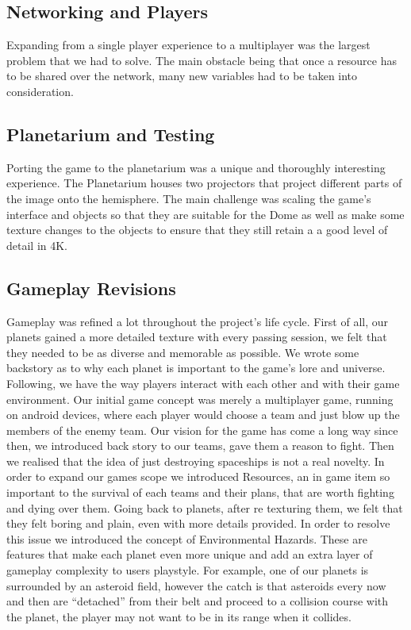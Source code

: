 \documentclass[11pt,a4paper]{article}
\begin{document}
        \subsection{Networking and Players}
        Expanding from a single player experience to a multiplayer was the largest problem that we had to solve. The main obstacle being that once a resource has to be shared over the network, many new variables had to be taken into consideration.

        \subsection{Planetarium and Testing}
        Porting the game to the planetarium was a unique and thoroughly interesting experience. The Planetarium houses two projectors that project different parts of the image onto the hemisphere. The main challenge was scaling the game's interface and objects so that they are suitable for the Dome as well as make some texture changes to the objects to ensure that they still retain a a good level of detail in 4K.

        \subsection{Gameplay Revisions}
        Gameplay was refined a lot throughout the project's life cycle. 
        First of all, our planets gained a more detailed texture with every passing session, we felt that they needed to be as diverse and memorable as possible. We wrote some backstory as to why each planet is important to the game's lore and universe. 
        Following, we have the way players interact with each other and with their game environment. Our initial game concept was merely a multiplayer game, running on android devices, where each player would choose a team and just blow up the members of the enemy team. Our vision for the game has come a long way since then, we introduced back story to our teams, gave them a reason to fight. Then we realised that the idea of just destroying spaceships is not a real novelty. In order to expand our games scope we introduced Resources, an in game item so important to the survival of each teams and their plans, that are worth fighting and dying over them. 
        Going back to planets, after re texturing them, we felt that they felt boring and plain, even with more details provided. In order to resolve this issue we introduced the concept of Environmental Hazards. These are features that make each planet even more unique and add an extra layer of gameplay complexity to users playstyle. For example, one of our planets is surrounded by an asteroid field, however the catch is that asteroids every now and then are “detached” from their belt and proceed to a collision course with the planet, the player may not want to be in its range when it collides.
\end{document}
